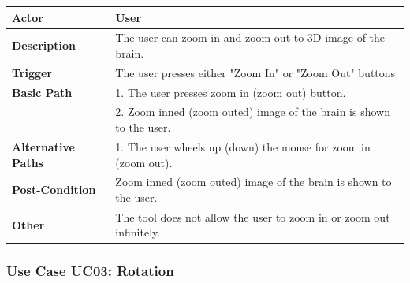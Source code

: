 \documentclass[paper=a4, fontsize=12pt]{scrartcl}	%
\numberwithin{equation}{section}		%
\numberwithin{figure}{section}			%
\numberwithin{table}{section}				%
\newcommand{\skipsubsection}[0]{\vspace{1cm}}
\begin{document}
    	\begin{center}
        	\begin{tabular}{ | p{4cm} | p{9cm} |}
            	\hline
                	\textbf{Actor} & User\\ \hline
                    \textbf{Description} & The user can zoom in and zoom out to 3D image of the brain.\\ \hline
                    \textbf{Trigger} & The user presses either "Zoom In" or "Zoom Out" buttons\\ \hline
                    \textbf{Basic Path} & 1. The user presses zoom in (zoom out) button.\\
                    & 2. Zoom inned (zoom outed) image of the brain is shown to the user.\\\hline
                    \textbf{Alternative Paths} & 1. The user wheels up (down) the mouse for zoom in (zoom out).\\ \hline
                    \textbf{Post-Condition} & Zoom inned (zoom outed) image of the brain is shown to the user.\\ \hline
                    \textbf{Other} & The tool does not allow the user to zoom in or zoom out infinitely.\\
                \hline
            \end{tabular}
        \end{center}
    \skipsubsection
    
    \subsubsection{Use Case UC03: Rotation}
    \begin{center}
     \end{center}
    
\end{document}
